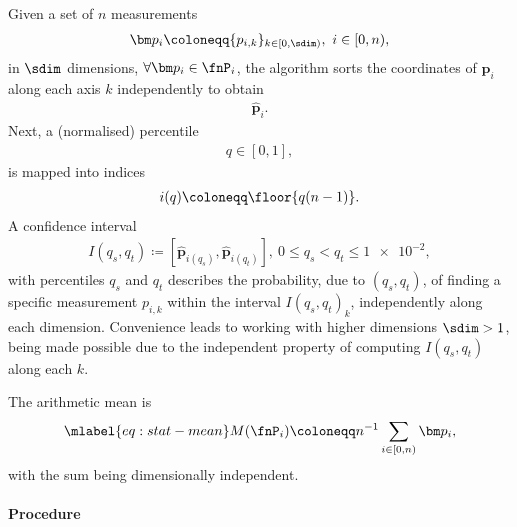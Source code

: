 %
Given a set of $n$ measurements 
\begin{align*}
  \bm p_i \coloneqq \{ p_{i,k} \}_{k \in [0,\sdim)},\ i \in [0,n),
\end{align*}
in $\sdim$ dimensions, $\forall \bm p_i \in \fnP_i$, the algorithm sorts the coordinates of $\bm p_i$ along each axis $k$ independently to obtain
\begin{align*}
  \widehat{\bm p}_i.
\end{align*}
Next, a (normalised) percentile
\begin{align*}
  q \in [0, 1],
\end{align*}
is mapped into indices
\begin{align*}
  i(q) \coloneqq \floor{q (n-1)}.
\end{align*}
A confidence interval
\begin{align*}
  I(q_s, q_t) \coloneqq [\widehat{\bm p}_{i(q_s)}, \widehat{\bm p}_{i(q_t)}],\ 0 \leq q_s < q_t \leq \num{1e-2},
\end{align*}
with percentiles $q_s$ and $q_t$ describes the probability, due to $(q_s, q_t)$, of finding a specific measurement $p_{i,k}$ within the interval $I(q_s, q_t)_k$, independently along each dimension. Convenience leads to working with higher dimensions $\sdim >1$, being made possible due to the independent property of computing $I(q_s, q_t)$ along each $k$.

The arithmetic mean is
\begin{align}\mlabel{eq:stat-mean}
  M(\fnP_i) \coloneqq n^{-1} \sum_{i\in[0,n)} \bm p_i,
\end{align}
with the sum being dimensionally independent.


\paragraph{Procedure}

\begin{synopsis}
\end{synopsis}

